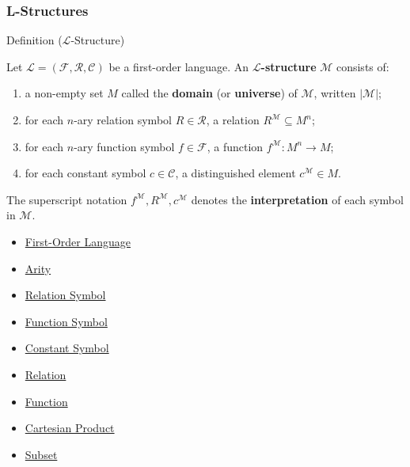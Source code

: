 
\subsubsection*{L-Structures}

\begin{definitionbox}{Definition ($\mathcal{L}$-Structure)}
\begin{definition}\label{def:l-structure}
Let $\mathcal{L} = (\mathcal{F}, \mathcal{R}, \mathcal{C})$ be a
first-order language.
An \textbf{$\mathcal{L}$-structure} $\mathcal{M}$ consists of:
\begin{enumerate}
  \item a non-empty set $M$ called the \textbf{domain} (or
        \textbf{universe}) of $\mathcal{M}$, written $|\mathcal{M}|$;
  \item for each $n$-ary relation symbol $R \in \mathcal{R}$,
        a relation $R^{\mathcal{M}} \subseteq M^n$;
  \item for each $n$-ary function symbol $f \in \mathcal{F}$,
        a function $f^{\mathcal{M}} : M^n \to M$;
  \item for each constant symbol $c \in \mathcal{C}$,
        a distinguished element $c^{\mathcal{M}} \in M$.
\end{enumerate}
The superscript notation $f^{\mathcal{M}}, R^{\mathcal{M}}, c^{\mathcal{M}}$
denotes the \textbf{interpretation} of each symbol in $\mathcal{M}$.
\end{definition}
\end{definitionbox}

\begin{dependencies}
\begin{itemize}
  \item \hyperref[def:first-order-language]{First-Order Language}
  \item \hyperref[def:arity]{Arity}
  \item \hyperref[def:relation-symbol]{Relation Symbol}
  \item \hyperref[def:function-symbol]{Function Symbol}
  \item \hyperref[def:constant-symbol]{Constant Symbol}
  \item \hyperref[def:relation]{Relation}
  \item \hyperref[def:function]{Function}
  \item \hyperref[def:cartesian-product]{Cartesian Product}
  \item \hyperref[def:subset]{Subset}
\end{itemize}
\end{dependencies}

